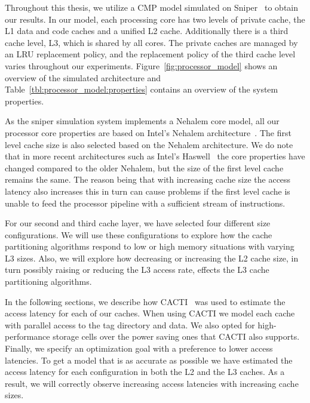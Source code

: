Throughout this thesis, we utilize a CMP model simulated on Sniper~\cite{Carlson2011a} to obtain our results. 
In our model, each processing core has two levels of private cache, the L1 data and code caches and a unified L2 cache.
Additionally there is a third cache level, L3, which is shared by all cores. 
The private caches are managed by an LRU replacement policy, and the replacement policy of the third cache level varies throughout our experiments.
Figure~\ref{fig:processor_model} shows an overview of the simulated architecture and Table~\ref{tbl:processor_model:properties} contains an overview of the system properties.

As the sniper simulation system implements a Nehalem core model, all our processor core properties are based on Intel's Nehalem architecture~\cite{Thomadakis2011}. 
The first level cache size is also selected based on the Nehalem architecture. 
We do note that in more recent architectures such as Intel's Haswell~\cite{Jain2013} the core properties have changed compared to the older Nehalem, but the size of the first level cache remains the same.
The reason being that with increasing cache size the access latency also increases this in turn can cause problems if the first level cache is unable to feed the processor pipeline with a sufficient stream of instructions.

For our second and third cache layer, we have selected four different size configurations. 
We will use these configurations to explore how the cache partitioning algorithms respond to low or high memory situations with varying L3 sizes.
Also, we will explore how decreasing or increasing the L2 cache size, in turn possibly raising or reducing the L3 access rate, effects the L3 cache partitioning algorithms.




In the following sections, we describe how CACTI~ was used to estimate the access latency for each of our caches. 
When using CACTI we model each cache with parallel access to the tag directory and data.
We also opted for high-performance storage cells over the power saving ones that CACTI also supports.
Finally, we specify an optimization goal with a preference to lower access latencies.
To get a model that is as accurate as possible we have estimated the access latency for each configuration in both the L2 and the L3 caches.
As a result, we will correctly observe increasing access latencies with increasing cache sizes.


